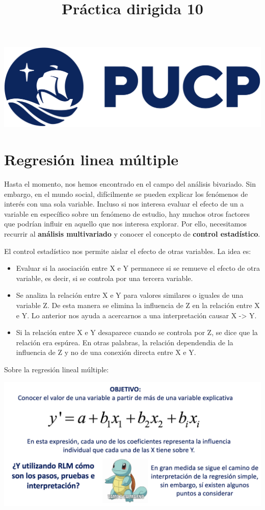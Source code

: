 \documentclass[
]{article}
\title{Práctica dirigida 10}
\author{}
\date{\vspace{-2.5em}}
\begin{document}
\maketitle

{
\setcounter{tocdepth}{1}
\tableofcontents
}
\includegraphics[width=0.3\linewidth]{logoPUCP}

\section{\texorpdfstring{\textbf{Regresión linea
múltiple}}{Regresión linea múltiple}}\label{regresiuxf3n-linea-muxfaltiple}

Hasta el momento, nos hemos encontrado en el campo del análisis
bivariado. Sin embargo, en el mundo social, difícilmente se pueden
explicar los fenómenos de interés con una sola variable. Incluso si nos
interesa evaluar el efecto de un a variable en específico sobre un
fenómeno de estudio, hay muchos otros factores que podrían influir en
aquello que nos interesa explorar. Por ello, necesitamos recurrir al
\textbf{análisis multivariado} y conocer el concepto de \textbf{control
estadístico}.

El control estadístico nos permite aislar el efecto de otras variables.
La idea es:

\begin{itemize}
\item
  Evaluar si la asociación entre X e Y permanece si se remueve el efecto
  de otra variable, es decir, si se controla por una tercera variable.
\item
  Se analiza la relación entre X e Y para valores similares o iguales de
  una variable Z. De esta manera se elimina la influencia de Z en la
  relación entre X e Y. Lo anterior nos ayuda a acercarnos a una
  interpretación causar X -\textgreater{} Y.
\item
  Si la relación entre X e Y desaparece cuando se controla por Z, se
  dice que la relación era espúrea. En otras palabras, la relación
  dependendia de la influencia de Z y no de una conexión directa entre X
  e Y.
\end{itemize}

Sobre la regresión lineal múltiple:

\begin{center}\includegraphics[width=1\linewidth]{pd12_diap1} \end{center}
\end{document}
